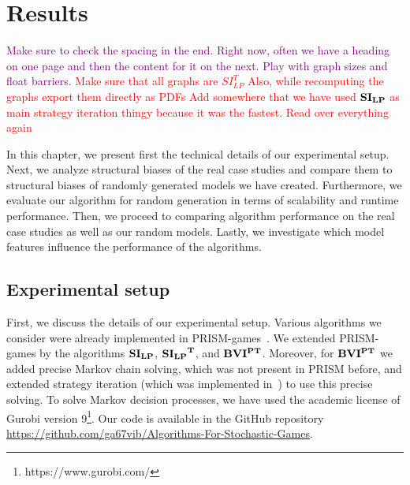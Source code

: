 \chapter{Results} \label{ch:results}

\textcolor{purple}{Make sure to check the spacing in the end. Right now, often we have a heading on one page and then the content for it on the next. Play with graph sizes and float barriers.}
\textcolor{red}{Make sure that all graphs are $SI_{LP}^T$}
\textcolor{red}{Also, while recomputing the graphs export them directly as PDFs}
\textcolor{red}{Add somewhere that we have used $\mathbf{SI_{LP}}$ as main strategy iteration thingy because it was the fastest.}
\textcolor{red}{Read over everything again}

In this chapter, we present first the technical details of our experimental setup.
Next, we analyze structural biases of the real case studies and compare them to structural biases of randomly generated models we have created.
Furthermore, we evaluate our algorithm for random generation in terms of scalability and runtime performance.
Then, we proceed to comparing algorithm performance on the real case studies as well as our random models.
Lastly, we investigate which model features influence the performance of the algorithms.



\section{Experimental setup}
First, we discuss the details of our experimental setup.
Various algorithms we consider were already implemented in PRISM-games~\cite{prismgames3}.
We extended PRISM-games by the algorithms $\mathbf{SI_{LP}}$, $\mathbf{\mathbf{SI_{LP}}^T}$, and $\mathbf{BVI^{PT}}$.
Moreover, for $\mathbf{BVI^{PT}}$ we added precise Markov chain solving, which was not present in PRISM before, and extended strategy iteration (which was implemented in~\cite{gandalf}) to use this precise solving.
To solve Markov decision processes, we have used the academic license of Gurobi version 9\footnote{https://www.gurobi.com/}. 
Our code is available in the GitHub repository \url{https://github.com/ga67vib/Algorithms-For-Stochastic-Games}.

